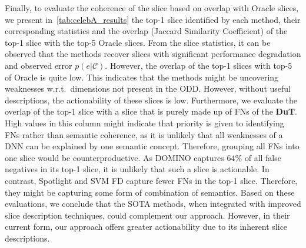 Finally, to evaluate the coherence of the slice based on overlap with Oracle slices, we present in~\cref{tab:celebA_results} the top-1 slice identified by each method, their corresponding statistics and the overlap (Jaccard Similarity Coefficient) of the top-1 slice with the top-5 Oracle slices. From the slice statistics, it can be observed that the methods recover slices with significant performance degradation and observed error $p(e|\mathcal{C})$. However, the overlap of the top-1 slices with top-5 of Oracle is quite low. This indicates that the methods might be uncovering weaknesses w.r.t.\ dimensions not present in the ODD. However, without useful descriptions, the actionability of these slices is low. Furthermore, we evaluate the overlap of the top-1 slice with a slice that is purely made up of FNs of the \textbf{DuT}. High values in this column might indicate that priority is given to identifying FNs rather than semantic coherence, as it is unlikely that all weaknesses of a DNN can be explained by one semantic concept. Therefore, grouping all FNs into one slice would be counterproductive. As DOMINO captures $64$\% of all false negatives in its top-1 slice, it is unlikely that such a slice is actionable. In contrast, Spotlight and SVM FD capture fewer FNs in the top-1 slice. Therefore, they might be capturing some form of combination of semantics. Based on these evaluations, we conclude that the SOTA methods, when integrated with improved slice description techniques, could complement our approach. However, in their current form, our approach offers greater actionability due to its inherent slice descriptions. 







